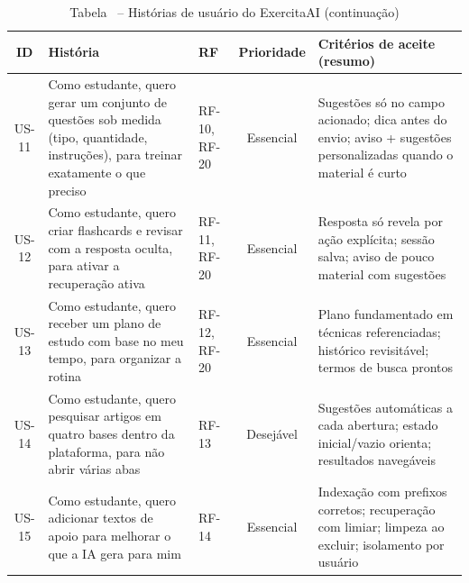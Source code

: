 \begin{table}[H]
\centering
\setlength{\tabcolsep}{2.5pt}
\caption*{Tabela \thetable\ -- Histórias de usuário do ExercitaAI (continuação)}
\begin{tabularx}{\textwidth}{|C|Y|L{1.5cm}|C|Y|}
\hline
\textbf{ID} & \textbf{História} & \textbf{RF} & \textbf{Prioridade} & \textbf{Critérios de aceite (resumo)} \\
\hline
US-11 & Como estudante, quero gerar um conjunto de questões sob medida (tipo, quantidade, instruções), para treinar exatamente o que preciso & RF-10, RF-20 & Essencial & Sugestões só no campo acionado; dica antes do envio; aviso + sugestões personalizadas quando o material é curto \\
\hline
US-12 & Como estudante, quero criar flashcards e revisar com a resposta oculta, para ativar a recuperação ativa & RF-11, RF-20 & Essencial & Resposta só revela por ação explícita; sessão salva; aviso de pouco material com sugestões \\
\hline
US-13 & Como estudante, quero receber um plano de estudo com base no meu tempo, para organizar a rotina & RF-12, RF-20 & Essencial & Plano fundamentado em técnicas referenciadas; histórico revisitável; termos de busca prontos \\
\hline
US-14 & Como estudante, quero pesquisar artigos em quatro bases dentro da plataforma, para não abrir várias abas & RF-13 & Desejável & Sugestões automáticas a cada abertura; estado inicial/vazio orienta; resultados navegáveis \\
\hline
US-15 & Como estudante, quero adicionar textos de apoio para melhorar o que a IA gera para mim & RF-14 & Essencial & Indexação com prefixos corretos; recuperação com limiar; limpeza ao excluir; isolamento por usuário \\
\hline
\end{tabularx}
\end{table}


